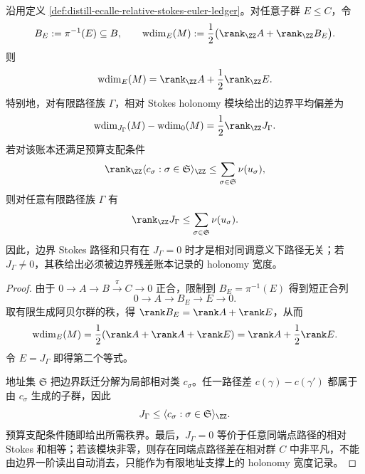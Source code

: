\begin{proposition}\label{prop:distill-ecalle-relative-stokes-euler-betti-audit}
沿用定义 \ref{def:distill-ecalle-relative-stokes-euler-ledger}。对任意子群
\(E\le C\)，令
\[
B_E:=\pi^{-1}(E)\subseteq B,\qquad
\mathrm{wdim}_E(M):=\frac12\bigl(\rank_{\ZZ}A+\rank_{\ZZ}B_E\bigr).
\]
则
\[
\mathrm{wdim}_E(M)=\rank_{\ZZ}A+\frac12\rank_{\ZZ}E.
\]
特别地，对有限路径族 \(\Gamma\)，相对 Stokes holonomy 模块给出的边界平均偏差为
\[
\mathrm{wdim}_{J_\Gamma}(M)-\mathrm{wdim}_{0}(M)
=\frac12\rank_{\ZZ}J_\Gamma.
\]
若对该账本还满足预算支配条件
\[
\rank_{\ZZ}\langle c_\sigma:\sigma\in\mathfrak S\rangle_{\ZZ}\le
\sum_{\sigma\in\mathfrak S}\nu(u_\sigma),
\]
则对任意有限路径族 \(\Gamma\) 有
\[
\rank_{\ZZ}J_\Gamma\le
\sum_{\sigma\in\mathfrak S}\nu(u_\sigma).
\]
因此，边界 Stokes 路径和只有在 \(J_\Gamma=0\) 时才是相对同调意义下路径无关；若
\(J_\Gamma\neq0\)，其秩给出必须被边界残差账本记录的 holonomy 宽度。
\end{proposition}
\begin{proof}
由于
\(0\to A\to B\xrightarrow{\pi}C\to0\) 正合，限制到 \(B_E=\pi^{-1}(E)\) 得到短正合列
\[
0\to A\to B_E\to E\to0.
\]
取有限生成阿贝尔群的秩，得
\(\rank B_E=\rank A+\rank E\)，从而
\[
\mathrm{wdim}_E(M)=\frac12(\rank A+\rank A+\rank E)
=\rank A+\frac12\rank E.
\]
令 \(E=J_\Gamma\) 即得第二个等式。

地址集 \(\mathfrak S\) 把边界跃迁分解为局部相对类 \(c_\sigma\)。任一路径差
\(c(\gamma)-c(\gamma')\) 都属于由 \(c_\sigma\) 生成的子群，因此
\[
J_\Gamma\le \langle c_\sigma:\sigma\in\mathfrak S\rangle_{\ZZ}.
\]
预算支配条件随即给出所需秩界。最后，\(J_\Gamma=0\) 等价于任意同端点路径的相对 Stokes 和相等；若该模块非零，则存在同端点路径差在相对群 \(C\) 中非平凡，不能由边界一阶读出自动消去，只能作为有限地址支撑上的 holonomy 宽度记录。
\end{proof}
